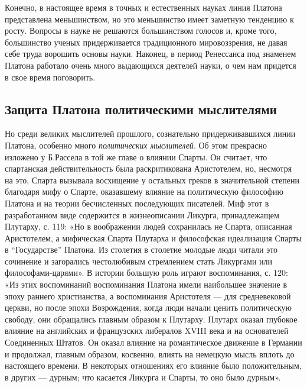Конечно, в настоящее время в точных и естественных науках линия
Платона представлена меньшинством, но это меньшинство имеет заметную
тенденцию к росту. Вопросы в науке не решаются большинством голосов и,
кроме того, большинство ученых придерживается традиционного
мировоззрения, не давая себе труда ворошить основы науки. Наконец, в
период Ренессанса под знаменем Платона работало очень много выдающихся
деятелей науки, о чем нам придется в свое время поговорить.

\subsection{Защита Платона политическими мыслителями}

Но среди великих мыслителей прошлого, сознательно придерживавшихся
линии Платона, особенно много \textit{политических мыслителей}. Об
этом прекрасно изложено у Б.Рассела в той же главе о влиянии Спарты.
Он считает, что спартанская действительность была раскритикована
Аристотелем, но, несмотря на это, Спарта вызывала восхищение у
остальных греков в значительной степени благодаря мифу о Спарте,
оказавшему влияние на политическую философию Платона и на теории
бесчисленных последующих писателей. Миф этот в разработанном виде
содержится в жизнеописании Ликурга, принадлежащем Плутарху, с. 119:
«Но в воображении людей сохранилась не Спарта, описанная Аристотелем,
а мифическая Спарта Плутарха и философская идеализация Спарты в
``Государстве'' Платона. Из столетия в столетие молодые люди читали
это сочинение и загорались честолюбивым стремлением стать Ликургами
или философами-царями». В истории большую роль играют воспоминания, с.
120: «Из этих воспоминаний воспоминания Платона имели наибольшее
значение в эпоху раннего христианства, а воспоминания Аристотеля ---
для средневековой церкви, но после эпохи Возрождения, когда люди
начали ценить политическую свободу, они обращались главным образом к
Плутарху. Плутарх оказал глубокое влияние на английских и французских
либералов XVIII века и на основателей Соединенных Штатов. Он оказал
влияние на романтическое движение в Германии и продолжал, главным
образом, косвенно, влиять на немецкую мысль вплоть до настоящего
времени. В некоторых отношениях его влияние было положительным, в
других --- дурным; что касается Ликурга и Спарты, то оно было дурным».

